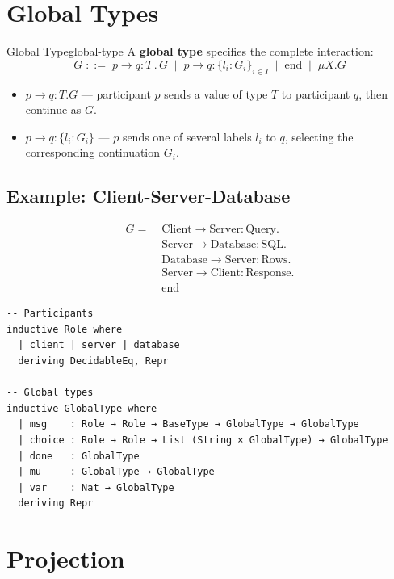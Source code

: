 \documentclass[11pt, a4paper, oneside]{book}
\newcommand{\pref}{\mathbin{.}}
\begin{document}
\section{Global Types}

\begin{defn}{Global Type}{global-type}
A \textbf{global type} specifies the complete interaction:
\[
  G \;::=\;
    p \to q : T \pref G
    \;\mid\; p \to q : \{l_i : G_i\}_{i \in I}
    \;\mid\; \text{end}
    \;\mid\; \mu X. G
\]
\begin{itemize}[nosep]
\item $p \to q : T. G$ --- participant $p$ sends a value of type $T$ to
  participant $q$, then continue as $G$.
\item $p \to q : \{l_i : G_i\}$ --- $p$ sends one of several labels
  $l_i$ to $q$, selecting the corresponding continuation $G_i$.
\end{itemize}
\end{defn}

\subsection{Example: Client-Server-Database}

\begin{align*}
  G = \;&\text{Client} \to \text{Server} : \text{Query}. \\
      &\text{Server} \to \text{Database} : \text{SQL}. \\
      &\text{Database} \to \text{Server} : \text{Rows}. \\
      &\text{Server} \to \text{Client} : \text{Response}. \\
      &\text{end}
\end{align*}

\begin{leanbox}
\begin{verbatim}
-- Participants
inductive Role where
  | client | server | database
  deriving DecidableEq, Repr

-- Global types
inductive GlobalType where
  | msg    : Role → Role → BaseType → GlobalType → GlobalType
  | choice : Role → Role → List (String × GlobalType) → GlobalType
  | done   : GlobalType
  | mu     : GlobalType → GlobalType
  | var    : Nat → GlobalType
  deriving Repr
\end{verbatim}
\end{leanbox}

\section{Projection}
\end{document}
